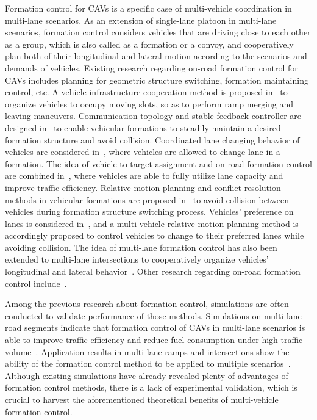 \documentclass[journal]{IEEEtranTIE}
\begin{document}
Formation control for CAVs is a specific case of multi-vehicle coordination in multi-lane scenarios. As an extension of single-lane platoon in multi-lane scenarios, formation control considers vehicles that are driving close to each other as a group, which is also called as a formation or a convoy, and cooperatively plan both of their longitudinal and lateral motion according to the scenarios and demands of vehicles. Existing research regarding on-road formation control for CAVs includes planning for geometric structure switching, formation maintaining control, etc. A vehicle-infrastructure cooperation method is proposed in~\cite{marinescu2012ramp} to organize vehicles to occupy moving slots, so as to perform ramp merging and leaving maneuvers. Communication topology and stable feedback controller are designed in~\cite{marjovi2015distributed} to enable vehicular formations to steadily maintain a desired formation structure and avoid collision. Coordinated lane changing behavior of vehicles are considered in~\cite{navarro2016distributed}, where vehicles are allowed to change lane in a formation. The idea of vehicle-to-target assignment and on-road formation control are combined in~\cite{cai2019multi,xu2021coordinated}, where vehicles are able to fully utilize lane capacity and improve traffic efficiency. Relative motion planning and conflict resolution methods in vehicular formations are proposed in~\cite{cai2021formationa,cai2021formationb} to avoid collision between vehicles during formation structure switching process. Vehicles' preference on lanes is considered in~\cite{cai2021formationc}, and a multi-vehicle relative motion planning method is accordingly proposed to control vehicles to change to their preferred lanes while avoiding collision. The idea of multi-lane formation control has also been extended to multi-lane intersections to cooperatively organize vehicles' longitudinal and lateral behavior~\cite{xu2021coordinated,cai2021multi}. Other research regarding on-road formation control include~\cite{zheng2021distance, cao2021platoon, firoozi2021formation}.

Among the previous research about formation control, simulations are often conducted to validate performance of those methods. Simulations on multi-lane road segments indicate that formation control of CAVs in multi-lane scenarios is able to improve traffic efficiency and reduce fuel consumption under high traffic volume~\cite{cai2019multi,cai2021formationa}. Application results in multi-lane ramps and intersections show the ability of the formation control method to be applied to multiple scenarios~\cite{cai2021formationb,cai2021formationc,cai2021multi}. Although existing simulations have already revealed plenty of advantages of formation control methods, there is a lack of experimental validation, which is crucial to harvest the aforementioned theoretical benefits of multi-vehicle formation control.
\end{document}
